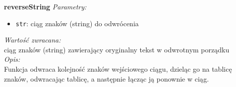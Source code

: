  \sectionZadanie

 \textbf{reverseString}  
\textit{Parametry:}  
\begin{itemize}  
  \item \texttt{str}: ciąg znaków (string) do odwrócenia  
\end{itemize}  
\textit{Wartość zwracana:}  \\
ciąg znaków (string) zawierający oryginalny tekst w odwrotnym porządku  \\
\textit{Opis:}  \\
Funkcja odwraca kolejność znaków wejściowego ciągu, dzieląc go na tablicę znaków, odwracając tablicę, a następnie łącząc ją ponownie w ciąg. \\ 

